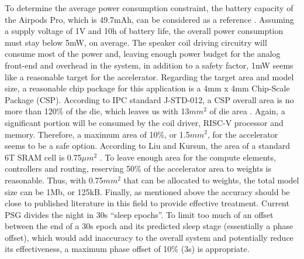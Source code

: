 \documentclass[12pt, hidelinks]{article}
\begin{document}
    To determine the average power consumption constraint, the battery capacity of the Airpods Pro, which is 49.7mAh, can be considered as a reference \cite*{Airpods3C}. Assuming a supply voltage of 1V and 10h of battery life, the overall power consumption must stay below 5mW,
    on average. The speaker coil driving circuitry will consume most of the power and, leaving enough power budget for the analog front-end and overhead in the system, in addition to a safety factor, 1mW seems like a reasonable target for the accelerator. Regarding the target
    area and model size, a reasonable chip package for this application is a 4mm x 4mm Chip-Scale Package (CSP). According to IPC standard J-STD-012, a CSP overall area is no more than 120\% of the die, which leaves us with 13$mm^2$ of die area \cite*{J_STD_012}.
    Again, a significant portion will be consumed by the coil driver, RISC-V processor and memory. Therefore, a maximum area of 10\%, or 1.5$mm^2$, for the accelerator seems to be a safe option. According to Liu and Kursun, the area of a standard 6T SRAM cell is 0.75$\mu m^2$
    \cite*{liu2008characterization}. To leave enough area for the compute elements, controllers and routing, reserving 50\% of the accelerator area to weights is reasonable. Thus, with 0.75$mm^2$ that can be allocated to weights, the total model size can be 1Mb, or 125kB. Finally,
    as mentioned above the accuracy should be close to published literature in this field to provide effective treatment. Current PSG divides the night in 30s ``sleep epochs''. To limit too much of an offset between the end of a 30s epoch and its predicted sleep stage (essentially
    a phase offset), which would add inaccuracy to the overall system and potentially reduce its effectiveness, a maximum phase offset of 10\% (3s) is appropriate.
\end{document}
